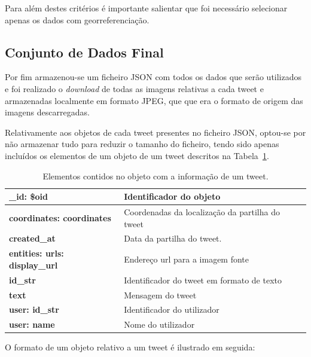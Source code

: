 Para além destes critérios é importante salientar que foi necessário selecionar apenas os dados com georreferenciação. 

\subsection{Conjunto de Dados Final}

Por fim armazenou-se um ficheiro JSON com todos os dados que serão utilizados e foi realizado o \textit{download} de todas as imagens relativas a cada tweet e armazenadas localmente em formato JPEG, que que era o formato de origem das imagens descarregadas. 

Relativamente aos objetos de cada tweet presentes no ficheiro JSON, optou-se por não armazenar tudo para reduzir o tamanho do ficheiro, tendo sido apenas incluídos os elementos de um objeto de um tweet descritos na Tabela~\ref{tab:elemtweet}.
\begin{table}[h]
\centering
\begin{tabular}{|l|l|}
\hline
\textbf{\_id: \$oid}                  & Identificador do objeto                         \\ \hline
\textbf{coordinates: coordinates}     & Coordenadas da localização da partilha do tweet \\ \hline
\textbf{created\_at}                  & Data da partilha do tweet.                      \\ \hline
\textbf{entities: urls: display\_url} & Endereço url para a imagem fonte                \\ \hline
\textbf{id\_str}                      & Identificador do tweet em formato de texto      \\ \hline
\textbf{text}                         & Mensagem do tweet                               \\ \hline
\textbf{user: id\_str}                & Identificador do utilizador                     \\ \hline
\textbf{user: name}                   & Nome do utilizador                              \\ \hline
\end{tabular}
\caption{Elementos contidos no objeto com a informação de um tweet.}
\label{tab:elemtweet}
\end{table}

O formato de um objeto relativo a um tweet é ilustrado em seguida:


